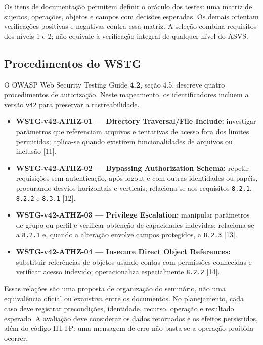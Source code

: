 Os itens de documentação permitem definir o oráculo dos testes: uma
matriz de sujeitos, operações, objetos e campos com decisões esperadas.
Os demais orientam verificações positivas e negativas contra essa
matriz. A seleção combina requisitos dos níveis 1 e 2; não equivale à
verificação integral de qualquer nível do ASVS.

\subsection{Procedimentos do WSTG}\label{procedimentos-do-wstg}

O OWASP Web Security Testing Guide \textbf{4.2}, seção 4.5, descreve
quatro procedimentos de autorização. Neste mapeamento, os
identificadores incluem a versão \texttt{v42} para preservar a
rastreabilidade.

\begin{itemize}
\tightlist
\item
  \textbf{WSTG-v42-ATHZ-01 --- Directory Traversal/\allowbreak{}File Include:}
  investigar parâmetros que referenciam arquivos e tentativas de acesso
  fora dos limites permitidos; aplica-se quando existirem
  funcionalidades de arquivos ou inclusão {[}11{]}.
\item
  \textbf{WSTG-v42-ATHZ-02 --- Bypassing Authorization Schema:} repetir
  requisições sem autenticação, após logout e com outras identidades ou
  papéis, procurando desvios horizontais e verticais; relaciona-se aos
  requisitos \texttt{8.2.1}, \texttt{8.2.2} e \texttt{8.3.1} {[}12{]}.
\item
  \textbf{WSTG-v42-ATHZ-03 --- Privilege Escalation:} manipular
  parâmetros de grupo ou perfil e verificar obtenção de capacidades
  indevidas; relaciona-se a \texttt{8.2.1} e, quando a alteração envolve
  campos protegidos, a \texttt{8.2.3} {[}13{]}.
\item
  \textbf{WSTG-v42-ATHZ-04 --- Insecure Direct Object References:}
  substituir referências de objetos usando contas com permissões
  conhecidas e verificar acesso indevido; operacionaliza especialmente
  \texttt{8.2.2} {[}14{]}.
\end{itemize}

Essas relações são uma proposta de organização do seminário, não uma
equivalência oficial ou exaustiva entre os documentos. No planejamento,
cada caso deve registrar precondições, identidade, recurso, operação e
resultado esperado. A avaliação deve considerar os dados retornados e os
efeitos persistidos, além do código HTTP: uma mensagem de erro não basta
se a operação proibida ocorrer.

